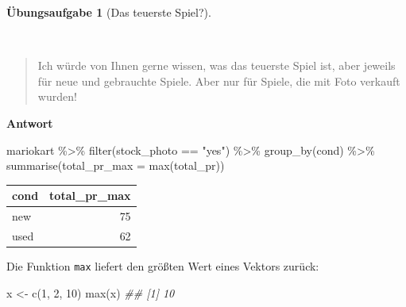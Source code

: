 \documentclass[
  a4paper,
]{scrbook}
\newenvironment{Shaded}{\begin{snugshade}}{\end{snugshade}}
\newcommand{\AttributeTok}[1]{\textcolor[rgb]{0.40,0.45,0.13}{#1}}
\newcommand{\DecValTok}[1]{\textcolor[rgb]{0.68,0.00,0.00}{#1}}
\newcommand{\DocumentationTok}[1]{\textcolor[rgb]{0.37,0.37,0.37}{\textit{#1}}}
\newcommand{\FunctionTok}[1]{\textcolor[rgb]{0.28,0.35,0.67}{#1}}
\newcommand{\NormalTok}[1]{\textcolor[rgb]{0.00,0.23,0.31}{#1}}
\newcommand{\OtherTok}[1]{\textcolor[rgb]{0.00,0.23,0.31}{#1}}
\newcommand{\SpecialCharTok}[1]{\textcolor[rgb]{0.37,0.37,0.37}{#1}}
\newcommand{\StringTok}[1]{\textcolor[rgb]{0.13,0.47,0.30}{#1}}
\theoremstyle{definition}
\theoremstyle{definition}
\theoremstyle{definition}
\newtheorem{exercise}{Übungsaufgabe}[chapter]
\theoremstyle{remark}
\begin{document}
\begin{exercise}[Das teuerste
Spiel?]\protect\hypertarget{exr-fofrage1}{}\label{exr-fofrage1}

~

\begin{quote}
{} Ich würde von Ihnen gerne wissen, was das teuerste Spiel
ist, aber jeweils für neue und gebrauchte Spiele. Aber nur für Spiele,
die mit Foto verkauft wurden!
\end{quote}

\textbf{Antwort}

\begin{Shaded}
\begin{Highlighting}[]
\NormalTok{mariokart }\SpecialCharTok{\%\textgreater{}\%} 
  \FunctionTok{filter}\NormalTok{(stock\_photo }\SpecialCharTok{==} \StringTok{"yes"}\NormalTok{) }\SpecialCharTok{\%\textgreater{}\%} 
  \FunctionTok{group\_by}\NormalTok{(cond) }\SpecialCharTok{\%\textgreater{}\%} 
  \FunctionTok{summarise}\NormalTok{(}\AttributeTok{total\_pr\_max =} \FunctionTok{max}\NormalTok{(total\_pr))}
\end{Highlighting}
\end{Shaded}

\begin{longtable}[]{@{}lr@{}}
\toprule\noalign{}
cond & total\_pr\_max \\
\midrule\noalign{}
\endhead
\bottomrule\noalign{}
\endlastfoot
new & 75 \\
used & 62 \\
\end{longtable}

Die Funktion \texttt{max} liefert den größten Wert eines Vektors zurück:

\begin{Shaded}
\begin{Highlighting}[]
\NormalTok{x }\OtherTok{\textless{}{-}} \FunctionTok{c}\NormalTok{(}\DecValTok{1}\NormalTok{, }\DecValTok{2}\NormalTok{, }\DecValTok{10}\NormalTok{)}
\FunctionTok{max}\NormalTok{(x)}
\DocumentationTok{\#\# [1] 10}
\end{Highlighting}
\end{Shaded}

\end{exercise}
\end{document}
